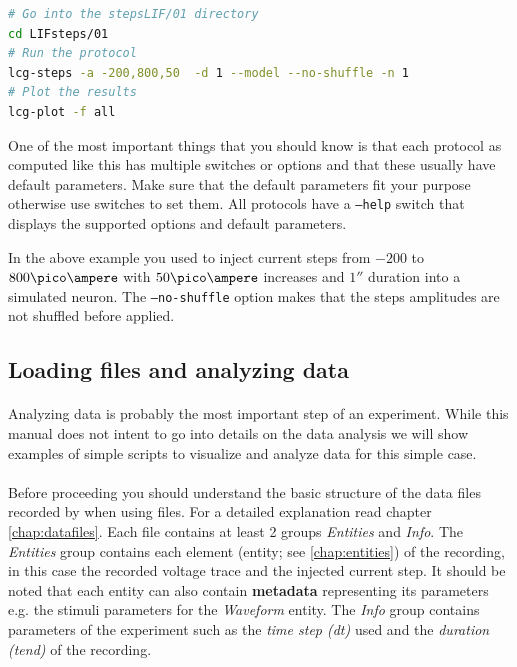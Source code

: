 \begin{lstlisting}[numbers=none,language=bash]
# Go into the stepsLIF/01 directory
cd LIFsteps/01
# Run the protocol
lcg-steps -a -200,800,50  -d 1 --model --no-shuffle -n 1
# Plot the results
lcg-plot -f all
\end{lstlisting}
One of the most important things that you should know is that each protocol as computed like this has multiple switches or options and that these usually have default parameters. Make sure that the default parameters fit your purpose otherwise use switches to set them. All protocols have a \texttt{--help} switch that displays the supported options and default parameters.

In the above example you used \progname to inject current steps from $-200$ to $800\pico\ampere$  with $50\pico\ampere$ increases and $1 \second$ duration into a simulated neuron. The \texttt{--no-shuffle} option makes that the steps amplitudes are not shuffled before applied.

\subsection{Loading files and analyzing data}
\paragraph{}Analyzing data is probably the most important step of an experiment. While this manual does not intent to go into details on the data analysis we will show examples of simple scripts to visualize and analyze data for this simple case.
\paragraph{} Before proceeding you should understand the basic structure of the data files recorded by \progname when using \hdf files. For a detailed explanation read chapter \ref{chap:datafiles}. Each file contains at least 2 groups \emph{Entities} and \emph{Info}. The \emph{Entities} group contains each element (entity; see \ref{chap:entities}) of the recording, in this case the recorded voltage trace and the injected current step. It should be noted that each entity can also contain \textbf{metadata} representing its parameters e.g. the stimuli parameters for the \emph{Waveform} entity. The \emph{Info} group contains parameters of the experiment such as the \emph{time step (dt)} used and the \emph{duration (tend)} of the recording.


